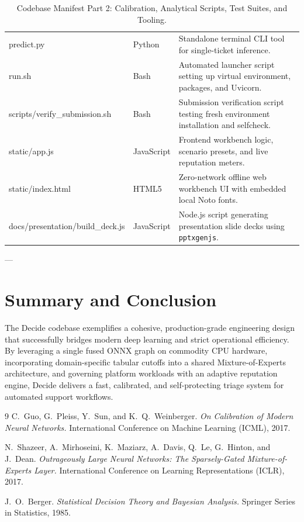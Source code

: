 \documentclass[11pt,a4paper]{article}
\begin{document}
\begin{table}[htbp]
\begin{tabularx}{\linewidth}{>{\raggedright\arraybackslash\ttfamily\small}p{5.1cm} >{\raggedright\arraybackslash}p{1.8cm} >{\raggedright\arraybackslash}X}
predict.py & Python & Standalone terminal CLI tool for single-ticket inference. \\
run.sh & Bash & Automated launcher script setting up virtual environment, packages, and Uvicorn. \\
scripts/verify\_submission.sh & Bash & Submission verification script testing fresh environment installation and selfcheck. \\
static/app.js & JavaScript & Frontend workbench logic, scenario presets, and live reputation meters. \\
static/index.html & HTML5 & Zero-network offline web workbench UI with embedded local Noto fonts. \\
docs/presentation/build\_deck.js & JavaScript & Node.js script generating presentation slide decks using \texttt{pptxgenjs}. \\
\bottomrule
\end{tabularx}
\caption{Codebase Manifest Part 2: Calibration, Analytical Scripts, Test Suites, and Tooling.}
\label{tab:file_manifest_part2}
\end{table}

---

\section{Summary and Conclusion}
The Decide codebase exemplifies a cohesive, production-grade engineering design that successfully bridges modern deep learning and strict operational efficiency. By leveraging a single fused ONNX graph on commodity CPU hardware, incorporating domain-specific tabular cutoffs into a shared Mixture-of-Experts architecture, and governing platform workloads with an adaptive reputation engine, Decide delivers a fast, calibrated, and self-protecting triage system for automated support workflows.

\begin{thebibliography}{9}
C.~Guo, G.~Pleiss, Y.~Sun, and K.~Q.~Weinberger.
\newblock \emph{On Calibration of Modern Neural Networks.}
\newblock International Conference on Machine Learning (ICML), 2017.

N.~Shazeer, A.~Mirhoseini, K.~Maziarz, A.~Davis, Q.~Le, G.~Hinton, and J.~Dean.
\newblock \emph{Outrageously Large Neural Networks: The Sparsely-Gated Mixture-of-Experts Layer.}
\newblock International Conference on Learning Representations (ICLR), 2017.

J.~O.~Berger.
\newblock \emph{Statistical Decision Theory and Bayesian Analysis.}
\newblock Springer Series in Statistics, 1985.
\end{thebibliography}
\end{document}
